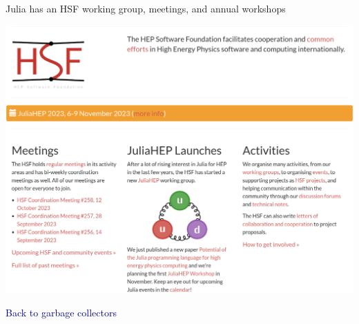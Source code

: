 \documentclass[aspectratio=169]{beamer}
\begin{document}
\begin{frame}{Julia has an HSF working group, meetings, and annual workshops}
\vspace{0.05 cm}
\begin{center}
\includegraphics[width=0.72\linewidth]{juliahep-website.png}
\end{center}
\end{frame}

\begin{frame}{}
\LARGE
\begin{center}
\textcolor{darkblue}{Back to garbage collectors}
\end{center}
\end{frame}
\end{document}
